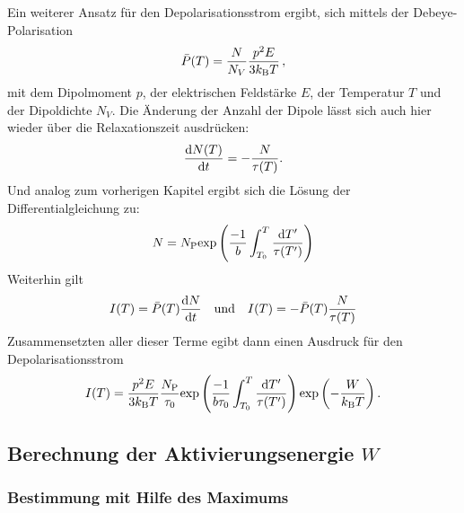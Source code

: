 		Ein weiterer Ansatz für den Depolarisationsstrom ergibt, sich mittels der Debeye-Polarisation
		\begin{equation}
			\bar{P}(T) = \frac{N}{N_V}\frac{p^2E}{3k_{\text{B}}T} \, ,
		\end{equation}	
		mit dem Dipolmoment $p$, der elektrischen Feldstärke $E$, der Temperatur $T$ und der Dipoldichte $N_V$.
		Die Änderung der Anzahl der Dipole lässt sich auch hier wieder über die Relaxationszeit ausdrücken:
		\begin{equation}
			\frac{\text{d} N(T)}{\text{d} t} =- \frac{N}{\tau(T)}.
		\end{equation}
		Und analog zum vorherigen Kapitel ergibt sich die Lösung der Differentialgleichung zu:
		\begin{equation}
			N = N_{\text{P}} \text{exp}\left( \frac{-1}{b}\int_{T_0}^T \frac{\text{d}T'}{\tau(T')}\right)
		\end{equation}
		Weiterhin gilt
		\begin{align}
			I(T) = \bar{P}(T)\frac{\text{d} N}{\text{d} t}& &\text{und} & & I(T) = -\bar{P}(T) \frac{N}{\tau(T)}
		\end{align}
		Zusammensetzten aller dieser Terme egibt dann einen Ausdruck für den Depolarisationsstrom
		\begin{equation}
			I(T) =\frac{p^2E}{3k_{\text{B}}T}\frac{N_{\text{P}}}{\tau_0}\text{exp}\left(\frac{-1}{b\tau_0}\int_{T_0}^T\frac{\text{d}T'}{\tau(T')}\right)\text{exp}\left(-\frac{W}{k_{\text{B}}T}\right).
			\label{eqn:long}
		\end{equation}		

	\subsection{Berechnung der Aktivierungsenergie $W$}
		
		\subsubsection{Bestimmung mit Hilfe des Maximums}

